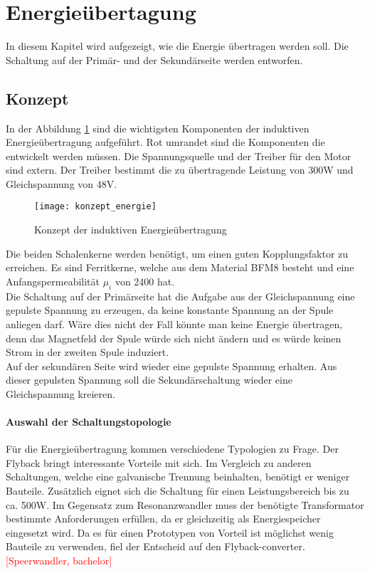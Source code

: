 \section{Energieübertagung}\label{sec:energie}
In diesem Kapitel wird aufgezeigt, wie die Energie übertragen werden soll. Die Schaltung auf der Primär- und der Sekundärseite werden entworfen.

\subsection{Konzept}
In der Abbildung \ref{fig:konzept_energie} sind die wichtigsten Komponenten der induktiven Energieübertragung aufgeführt. Rot umrandet sind die Komponenten die entwickelt werden müssen. Die Spannungsquelle und der Treiber für den Motor sind extern. Der Treiber bestimmt die zu übertragende Leistung von 300W und Gleichspannung von 48V.

\begin{figure}[h]
	\centering
	\texttt{[image: konzept\_energie]}
	\caption{Konzept der induktiven Energieübertragung}\label{fig:konzept_energie}
\end{figure}

Die beiden Schalenkerne werden benötigt, um einen guten Kopplungsfaktor zu erreichen. Es sind Ferritkerne, welche aus dem Material BFM8 besteht und eine Anfangspermeabilität $ \mu_{i} $ von 2400 hat.\\ Die Schaltung auf der Primärseite hat die Aufgabe aus der Gleichspannung eine gepulste Spannung zu erzeugen, da keine konstante Spannung an der Spule anliegen darf. Wäre dies nicht der Fall könnte man keine Energie übertragen, denn das Magnetfeld der Spule würde sich nicht ändern und es würde keinen Strom in der zweiten Spule induziert. \\
Auf der sekundären Seite wird wieder eine gepulste Spannung erhalten. Aus dieser gepulsten Spannung soll die Sekundärschaltung wieder eine Gleichspannung kreieren.

\paragraph{Auswahl der Schaltungstopologie}
Für die Energieübertragung kommen verschiedene Typologien zu Frage. Der Flyback bringt interessante Vorteile mit sich. Im Vergleich zu anderen Schaltungen, welche eine galvanische Trennung beinhalten, benötigt er weniger Bauteile. Zusätzlich eignet sich die Schaltung für einen Leistungsbereich bis zu ca. 500W. Im Gegensatz zum Resonanzwandler muss der benötigte Transformator bestimmte Anforderungen erfüllen, da er gleichzeitig als Energiespeicher eingesetzt wird. Da es für einen Prototypen von Vorteil ist möglichst wenig Bauteile zu verwenden, fiel der Entscheid auf den Flyback-converter.\textcolor{red}{[Speerwandler, bachelor]}

